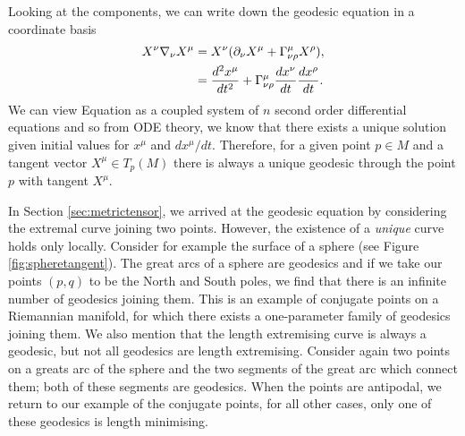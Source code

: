 Looking at the components, we can write down the geodesic equation in a coordinate basis
\begin{equation}
\label{eq:geocoord}
\begin{aligned}
		X^\nu \nabla_\nu X^\mu &=  X^\nu (\partial_\nu X^\mu + \Gamma^\mu_{\nu \rho} X^\rho), \\
		&= \frac{d ^2x^\mu}{d t^2} + \Gamma^\mu_{\nu \rho} \frac{d x^\nu}{d t}\frac{d x^\rho}{d t} .
\end{aligned}
\end{equation}
We can view Equation  as a coupled system of $n$ second order differential equations and so from ODE theory, we know that there exists a unique solution given initial values for $x^\mu$ and $d x^\mu / dt$. Therefore, for a given point $p \in M$ and a tangent vector $X^\mu \in T_p(M)$ there is always a unique geodesic through the point $p$ with tangent $X^\mu$.

In Section \ref{sec:metrictensor}, we arrived at the geodesic equation by considering the extremal curve joining two points. However, the existence of a \emph{unique} curve holds only locally. Consider for example the surface of a sphere (see Figure \ref{fig:spheretangent}). The great arcs of a sphere are geodesics and if we take our points $(p,q)$ to be the North and South poles, we find that there is an infinite number of geodesics joining them. This is an example of conjugate points on a Riemannian manifold, for which there exists a one-parameter family of geodesics joining them. We also mention that the length extremising curve is always a geodesic, but not all geodesics are length extremising. Consider again two points on a greats arc of the sphere and the two segments of the great arc which connect them; both of these segments are geodesics. When the points are antipodal, we return to our example of the conjugate points, for all other cases, only one of these geodesics is length minimising.

